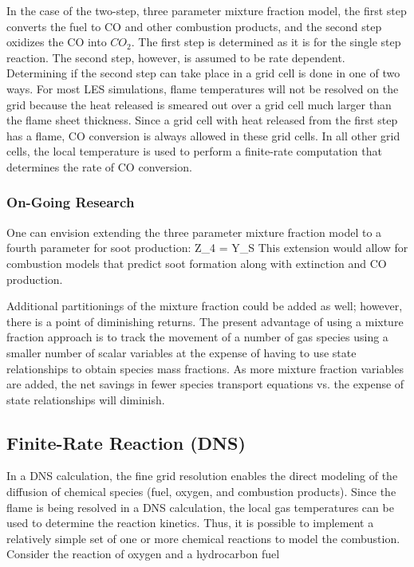 \documentclass[11pt]{book}
\begin{document}
In the case of the two-step, three parameter mixture fraction model, the first step converts the
fuel to CO and other combustion products, and the second step oxidizes the CO into $CO_2$.  The first step is
determined as it is for the single step reaction.  The second step, however, is assumed to be rate dependent.
Determining if the second step can take place in a grid cell is done in one of two ways.  For most LES
simulations, flame temperatures will not be resolved on the grid because the heat released is smeared out over a grid cell much larger than
the flame sheet thickness.  Since a grid cell with heat released from the first step has a flame, CO conversion is
always allowed in these grid cells.  In all other grid cells, the local temperature is used to perform a finite-rate
computation that determines the rate of CO conversion.



\subsubsection{On-Going Research}

One can envision extending the three parameter mixture fraction model to a fourth parameter for soot production:
\be Z_4 =  Y_S \ee
This extension would allow for combustion models that predict soot formation along with extinction and CO production.

Additional partitionings of the mixture fraction could be added as well; however, there is a point of diminishing
returns.  The present advantage of using a mixture fraction approach is to track the movement of a number of gas
species using a smaller number of scalar variables at the expense of having to use state relationships to obtain
species mass fractions.  As more mixture fraction variables are added, the net savings in fewer species transport
equations vs. the expense of state relationships will diminish.

\clearpage



\subsection{Finite-Rate Reaction (DNS)}

In a DNS calculation, the fine grid resolution enables the direct modeling of the diffusion of chemical species (fuel,
oxygen, and combustion products).  Since the flame is being resolved in a DNS calculation, the local gas
temperatures can be used to determine the reaction kinetics.  Thus, it is possible to implement a relatively simple
set of one or more chemical reactions to model the combustion. Consider the reaction of oxygen and a hydrocarbon
fuel
\end{document}
